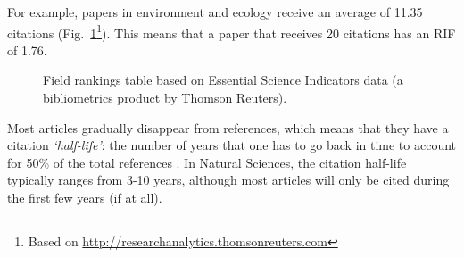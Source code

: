 \documentclass[graybox,envcountchap,sectrefs,UStrade]{svmono}
\begin{document}
For example, papers in environment and ecology receive an average of 11.35 citations (Fig.\@~\ref{Fig:ESI_world}\footnote{Based on \url{http://researchanalytics.thomsonreuters.com}}). This means that a paper that receives 20 citations has an RIF of 1.76.\par

\begin{figure}[!hbt]
\begin{center}
\caption{Field rankings table based on Essential Science Indicators data (a bibliometrics product by Thomson Reuters).}
\label{Fig:ESI_world}
\end{center}
\end{figure}

Most articles gradually disappear from references, which means that they have a citation \emph{`half-life'}: the number of years that one has to go back in time to account for 50\% of the total references \citep{Garfield1990CC}. In Natural Sciences, the citation half-life typically ranges from 3-10 years, although most articles will only be cited during the first few years (if at all).\par
\end{document}
